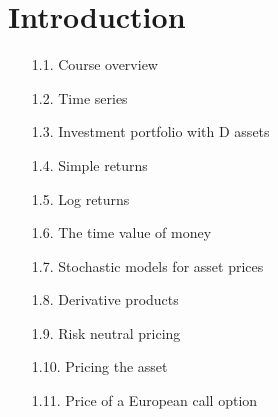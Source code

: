 \documentclass[]{article}
\begin{document}
\section{Introduction}
\begin{itemize}
\item[1.1.] Course overview
\item[1.2.] Time series
\item[1.3.] Investment portfolio with D assets
\item[1.4.] Simple returns
\item[1.5.] Log returns
\item[1.6.] The time value of money
\item[1.7.] Stochastic models for asset prices
\item[1.8.] Derivative products
\item[1.9.] Risk neutral pricing
\item[1.10.] Pricing the asset
\item[1.11.] Price of a European call option
\end{itemize}
\end{document}
